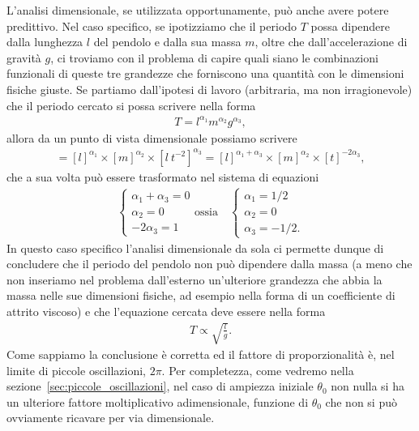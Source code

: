 L'analisi dimensionale, se utilizzata opportunamente, può anche avere potere
predittivo. Nel caso specifico, se ipotizziamo che il periodo $T$ possa
dipendere dalla lunghezza $l$ del pendolo e dalla sua massa $m$, oltre che
dall'accelerazione di gravità $g$, ci troviamo con il problema di capire
quali siano le combinazioni funzionali di queste tre grandezze che forniscono
una quantità con le dimensioni fisiche giuste. Se partiamo dall'ipotesi di
lavoro (arbitraria, ma non irragionevole) che il periodo cercato si possa
scrivere nella forma
\begin{align*}
  T = l^{\alpha_1} m^{\alpha_2} g^{\alpha_3},
\end{align*}
allora da un punto di vista dimensionale possiamo scrivere
\begin{align*}
  [t] = [l]^{\alpha_1} \times [m]^{\alpha_2} \times [l~t^{-2}]^{\alpha_3} =
  [l]^{\alpha_1 + \alpha_3} \times [m]^{\alpha_2} \times [t]^{-2\alpha_3},
\end{align*}
che a sua volta può essere trasformato nel sistema di equazioni
\begin{align*}
  \begin{cases}
    \alpha_1 + \alpha_3 = 0\\
    \alpha_2 = 0\\
    -2\alpha_3 = 1
  \end{cases}
  \text{ossia} \quad
  \begin{cases}
    \alpha_1 = 1/2\\
    \alpha_2 = 0\\
    \alpha_3 = -1/2.
  \end{cases}
\end{align*}
In questo caso specifico l'analisi dimensionale da sola ci permette dunque di
concludere che il periodo del pendolo non può dipendere dalla massa (a meno
che non inseriamo nel problema dall'esterno un'ulteriore grandezza che abbia
la massa nelle sue dimensioni fisiche, ad esempio nella forma di un coefficiente
di attrito viscoso) e che l'equazione cercata deve essere nella forma
\begin{align*}
  T \propto \sqrt{\frac{l}{g}}.
\end{align*}
Come sappiamo la conclusione è corretta ed il fattore di proporzionalità
è, nel limite di piccole oscillazioni, $2\pi$. Per completezza, come
vedremo nella sezione~\ref{sec:piccole_oscillazioni}, nel caso di ampiezza
iniziale $\theta_0$ non nulla si ha un ulteriore fattore moltiplicativo
adimensionale, funzione di $\theta_0$ che non si può ovviamente ricavare per
via dimensionale.


